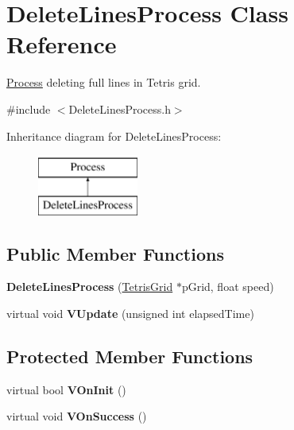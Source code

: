 \hypertarget{classDeleteLinesProcess}{\section{Delete\-Lines\-Process Class Reference}
\label{classDeleteLinesProcess}
}


\hyperlink{classProcess}{Process} deleting full lines in Tetris grid.  




{\ttfamily \#include $<$Delete\-Lines\-Process.\-h$>$}

Inheritance diagram for Delete\-Lines\-Process\-:\begin{figure}[H]
\begin{center}
\leavevmode
\includegraphics[height=2.000000cm]{classDeleteLinesProcess}
\end{center}
\end{figure}
\subsection*{Public Member Functions}
\begin{DoxyCompactItemize}
\item 
\hypertarget{classDeleteLinesProcess_af6f240617cb85e8f3d3a6c36ef17af65}{{\bfseries Delete\-Lines\-Process} (\hyperlink{classTetrisGrid}{Tetris\-Grid} $\ast$p\-Grid, float speed)}\label{classDeleteLinesProcess_af6f240617cb85e8f3d3a6c36ef17af65}

\item 
\hypertarget{classDeleteLinesProcess_a1c4cbbeec5485be7785426a70577cd42}{virtual void {\bfseries V\-Update} (unsigned int elapsed\-Time)}\label{classDeleteLinesProcess_a1c4cbbeec5485be7785426a70577cd42}

\end{DoxyCompactItemize}
\subsection*{Protected Member Functions}
\begin{DoxyCompactItemize}
\item 
\hypertarget{classDeleteLinesProcess_a52da53ec6ce9bad1e89807c41afddb38}{virtual bool {\bfseries V\-On\-Init} ()}\label{classDeleteLinesProcess_a52da53ec6ce9bad1e89807c41afddb38}

\item 
\hypertarget{classDeleteLinesProcess_aca5d8751a3d3066662529ac8e5fcc4b9}{virtual void {\bfseries V\-On\-Success} ()}\label{classDeleteLinesProcess_aca5d8751a3d3066662529ac8e5fcc4b9}

\end{DoxyCompactItemize}


